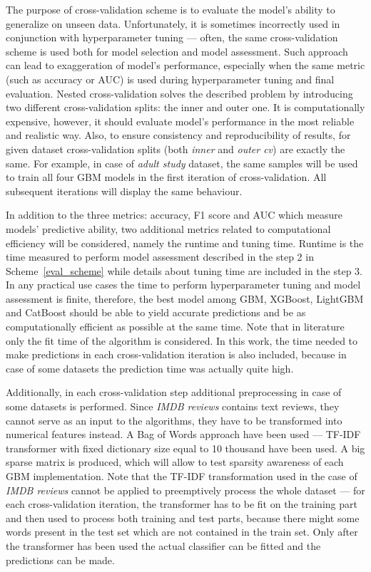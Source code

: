 \documentclass[magisterska, english]{pwr_wmat_praca_dyplomowa}
\theoremstyle{plain}
\numberwithin{theorem}{chapter}
\theoremstyle{definition}
\numberwithin{theorem}{chapter}
\begin{document}
The purpose of cross-validation scheme is to evaluate the model's ability to generalize on unseen data. Unfortunately, it is sometimes incorrectly used in conjunction with hyperparameter tuning --- often, the same cross-validation scheme is used both for model selection and model assessment. Such approach can lead to exaggeration of model's performance, especially when the same metric (such as accuracy or AUC) is used during hyperparameter tuning and final evaluation. Nested cross-validation solves the described problem by introducing two different cross-validation splits: the inner and outer one. 
It is computationally expensive, however, it should evaluate model's performance in the most reliable and realistic way. Also, to ensure consistency and reproducibility of results, for given dataset cross-validation splits (both \emph{inner} and \emph{outer cv}) are exactly the same. For example, in case of \emph{adult study} dataset, the same samples will be used to train all four GBM models in the first iteration of cross-validation. All subsequent iterations will display the same behaviour. 

In addition to the three metrics: accuracy, F1 score and AUC which measure models' predictive ability, two additional metrics related to computational efficiency will be considered, namely the runtime and tuning time. Runtime is the time measured to perform model assessment described in the step 2 in Scheme~\ref{eval_scheme} while details about tuning time are included in the step 3. In any practical use cases the time to perform hyperparameter tuning and model assessment is finite, therefore, the best model among GBM, XGBoost, LightGBM and CatBoost should be able to yield accurate predictions and be as computationally efficient as possible at the same time. Note that in literature only the fit time of the algorithm is considered. In this work, the time needed to make predictions in each cross-validation iteration is also included, because in case of some datasets the prediction time was actually quite high.

Additionally, in each cross-validation step additional preprocessing in case of some datasets is performed. Since \emph{IMDB reviews} contains text reviews, they cannot serve as an input to the algorithms, they have to be transformed into numerical features instead. A Bag of Words approach have been used --- TF-IDF transformer \cite{sklearn} with fixed dictionary size equal to 10 thousand have been used. A big sparse matrix is produced, which will allow to test sparsity awareness of each GBM implementation. 
Note that the TF-IDF transformation used in the case of \emph{IMDB reviews} cannot be applied to preemptively process the whole dataset --- for each cross-validation iteration, the transformer has to be fit on the training part and then used to process both training and test parts, because there might some words present in the test set which are not contained in the train set. Only after the transformer has been used the actual classifier can be fitted and the predictions can be made.
\end{document}
